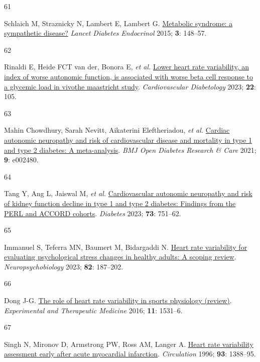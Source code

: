 \documentclass[
  letterpaper,
  headsepline=true,
  open=any]{scrbook}
\newlength{\cslhangindent}
\newlength{\csllabelwidth}
\newlength{\cslentryspacingunit} %
\newenvironment{CSLReferences}[2] %
 {%
  \setlength{\parindent}{0pt}
  \ifodd #1
  \let\oldpar\par
  \def\par{\hangindent=\cslhangindent\oldpar}
  \fi
  \setlength{\parskip}{#2\cslentryspacingunit}
 }%
 {}
\newcommand{\CSLLeftMargin}[1]{\parbox[t]{\csllabelwidth}{#1}}
\newcommand{\CSLRightInline}[1]{\parbox[t]{\linewidth - \csllabelwidth}{#1}\break}
\begin{document}
\begin{CSLReferences}{0}{0}
\leavevmode{}%
\CSLLeftMargin{61 }%
\CSLRightInline{Schlaich M, Straznicky N, Lambert E, Lambert G.
\href{https://doi.org/10.1016/s2213-8587(14)70033-6}{Metabolic syndrome:
a sympathetic disease?} \emph{Lancet Diabetes Endocrinol} 2015;
\textbf{3}: 148--57.}

\leavevmode{}%
\CSLLeftMargin{62 }%
\CSLRightInline{Rinaldi E, Heide FCT van der, Bonora E, \emph{et al.}
\href{https://doi.org/10.1186/s12933-023-01837-0}{Lower heart rate
variability, an index of worse autonomic function, is associated with
worse beta cell response to a glycemic load in vivo{\textemdash}the
maastricht study}. \emph{Cardiovascular Diabetology} 2023; \textbf{22}:
105.}

\leavevmode{}%
\CSLLeftMargin{63 }%
\CSLRightInline{Mahin Chowdhury, Sarah Nevitt, Aikaterini Eleftheriadou,
\emph{et al.} \href{https://doi.org/10.1136/bmjdrc-2021-002480}{Cardiac
autonomic neuropathy and risk of cardiovascular disease and mortality in
type 1 and type 2 diabetes: A meta-analysis}. \emph{BMJ Open Diabetes
Research \& Care} 2021; \textbf{9}: e002480.}

\leavevmode{}%
\CSLLeftMargin{64 }%
\CSLRightInline{Tang Y, Ang L, Jaiswal M, \emph{et al.}
\href{https://doi.org/10.2337/db23-0247}{Cardiovascular autonomic
neuropathy and risk of kidney function decline in type 1 and type 2
diabetes: Findings from the PERL and ACCORD cohorts}. \emph{Diabetes}
2023; \textbf{73}: 751--62.}

\leavevmode{}%
\CSLLeftMargin{65 }%
\CSLRightInline{Immanuel S, Teferra MN, Baumert M, Bidargaddi N.
\href{https://doi.org/10.1159/000530376}{Heart rate variability for
evaluating psychological stress changes in healthy adults: A scoping
review}. \emph{Neuropsychobiology} 2023; \textbf{82}: 187--202.}

\leavevmode{}%
\CSLLeftMargin{66 }%
\CSLRightInline{Dong J-G.
\href{https://doi.org/10.3892/etm.2016.3104}{The role of heart rate
variability in sports physiology (review)}. \emph{Experimental and
Therapeutic Medicine} 2016; \textbf{11}: 1531--6.}

\leavevmode{}%
\CSLLeftMargin{67 }%
\CSLRightInline{Singh N, Mironov D, Armstrong PW, Ross AM, Langer A.
\href{https://doi.org/10.1161/01.CIR.93.7.1388}{Heart rate variability
assessment early after acute myocardial infarction}. \emph{Circulation}
1996; \textbf{93}: 1388--95.}


\end{CSLReferences}
\end{document}
